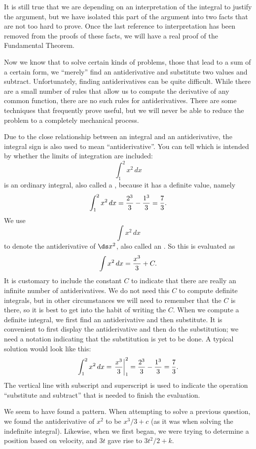 It is still true that we are depending on an interpretation of the
integral to justify the argument, but we have isolated this part of
the argument into two facts that are not too hard to prove. Once the
last reference to interpretation has been removed from the proofs of
these facts, we will have a real proof of the Fundamental Theorem.

Now we know that to solve certain kinds of problems, those that lead
to a sum of a certain form, we ``merely'' find an antiderivative and
substitute two values and subtract. Unfortunately, finding
antiderivatives can be quite difficult. While there are a small number
of rules that allow us to compute the derivative of any common
function, there are no such rules for antiderivatives. There are some
techniques that frequently prove useful, but we will never be able to
reduce the problem to a completely mechanical process.

Due to the close relationship between an integral and an
antiderivative, the integral sign is also used to mean
``antiderivative''. You can tell which is intended by whether the
limits of integration are included:
$$
  \int_1^2 x^2\,dx
$$
is an ordinary integral, also called a 
,
because it has a definite value, namely
$$
  \int_1^2 x^2\,dx={2^3\over3}-{1^3\over3}={7\over3}.
$$
We use
$$
  \int x^2\,dx
$$
to denote the antiderivative of $\ds x^2$, also called an
.
So this is evaluated as
$$
  \int x^2\,dx = {x^3\over 3}+C.
$$
It is customary to include the constant $C$ to indicate that there are
really an infinite number of antiderivatives. We do not need this $C$
to compute definite integrals, but in other circumstances we will need
to remember that the $C$ is there, so it is best to get into the habit
of writing the $C$.
When we compute a definite integral, we first find an antiderivative
and then substitute. It is convenient to first display the
antiderivative and then do the substitution; we need a notation
indicating that the substitution is yet to be done. A typical solution
would look like this:
$$
  \int_1^2 x^2\,dx=\left.{x^3\over 3}\right|_1^2 = 
  {2^3\over3}-{1^3\over3}={7\over3}.
$$
The vertical line with subscript and superscript is used to indicate
the operation ``substitute and subtract'' that is needed to finish the
evaluation.

We seem to have found a pattern. When attempting to solve a previous question, we found the antiderivative of $x^2$ to be $x^3/3+c$ (as it was when solving the indefinite integral). Likewise, when we first began, we were trying to determine a position based on velocity, and $3t$ gave rise to $3t^2/2+k$.

